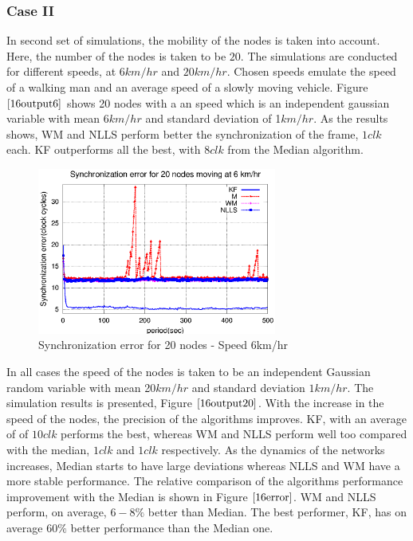 \documentclass[a4paper,10pt]{report}
\begin{document}
\subsubsection{\textbf{Case II}}
In second set of simulations, the mobility of the nodes is taken into account. Here, the number of the nodes is taken to be $20$. The simulations are conducted for different speeds, at $6km/hr$ and $20km/hr$. Chosen speeds emulate the speed of a walking man and an average speed of a slowly moving vehicle. 
\newline 
Figure $\ref{16output6}$ shows 20 nodes with a an speed which is an independent gaussian variable with mean $6km/hr$ and standard deviation of 1$km/hr$. As the results shows, WM and NLLS perform better the synchronization of the frame, $1 clk$ each. KF outperforms all the best, with $8 clk$ from the Median algorithm.
\newline
\begin{figure}
\centering
\includegraphics[width=0.7\textwidth]{16output-s6}
\caption{Synchronization error for 20 nodes - Speed 6km/hr} \label{16output6}
\end{figure}
In all cases the speed of the nodes is taken to be an independent Gaussian random variable with mean 20$km/hr$ and standard deviation $1km/hr$. The simulation results is presented, Figure $\ref{16output20}$. With the increase in the speed of the nodes, the precision of the algorithms improves. KF, with an average of of $10 clk$ performs the best, whereas WM and NLLS perform well too compared with the median, $1 clk$ and $1 clk$ respectively. As the dynamics of the networks increases, Median starts to have large deviations whereas NLLS and WM have a more stable performance. 
\newline 
The relative comparison of the algorithms performance improvement with the Median is shown in Figure $\ref{16error}$. WM and NLLS perform, on average, $6-8\%$ better than Median. The best performer, KF, has on average $60\%$ better performance than the Median one.
\end{document}
